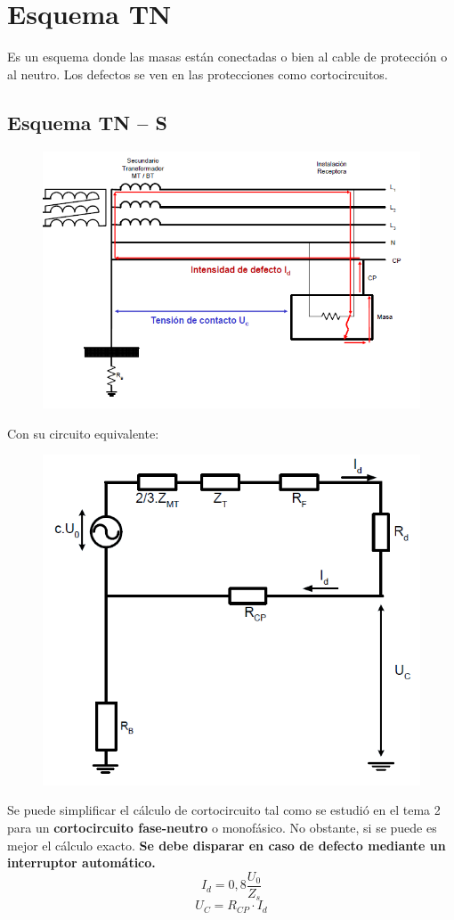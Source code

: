 \chapter{Esquema TN}
Es un esquema donde las masas están conectadas o bien al cable de protección o al neutro. Los defectos se ven en las protecciones como cortocircuitos.
\section{Esquema TN – S}
\begin{figure}[H]
	\centering
	\includegraphics[width=0.7\linewidth]{Images/29}
	\label{fig:29}
\end{figure}

Con su circuito equivalente:
\begin{figure}[H]
	\centering
	\includegraphics[width=0.5\linewidth]{Images/30}
	\label{fig:30}
\end{figure}

Se puede simplificar el cálculo de cortocircuito tal como se estudió en el tema 2 para un \textbf{cortocircuito fase-neutro} o monofásico. No obstante, si se puede es mejor el cálculo exacto. \textbf{Se debe disparar en caso de defecto mediante un interruptor automático.}
\begin{equation}
	I_d=0,8\dfrac{U_0}{Z_s}
\end{equation}
\begin{equation}
	U_C=R_{CP}\cdot I_d
\end{equation}
